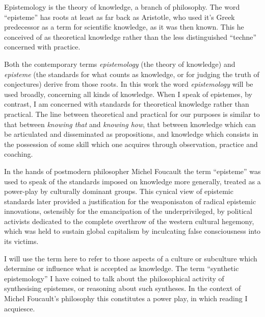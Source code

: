 \documentclass[10pt,titlepage]{article}
\begin{document}
Epistemology is the theory of knowledge, a branch of philosophy.
The word ``episteme'' has roots at least as far back as Aristotle, who used it's Greek predecessor as a term for scientific knowledge, as it was then known.
This he conceived of as theoretical knowledge rather than the less distinguished ``techne'' concerned with practice.

Both the contemporary terms \emph{epistemology} (the theory of knowledge) and \emph{episteme} (the standards for what counts as knowledge, or for judging the truth of conjectures) derive from those roots.
In this work the word \emph{epistemology} will be used broadly, concerning all kinds of knowledge.
When I speak of epistemes, by contrast, I am concerned with standards for theoretical knowledge rather than practical.
The line between theoretical and practical for our purposes is similar to that between \emph{knowing that} and \emph{knowing how}, that between knowledge which can be articulated and disseminated as propositions, and knowledge which consists in the possession of some skill which one acquires through observation, practice and coaching.

In the hands of postmodern philosopher Michel Foucault the term ``episteme'' was used to speak of the standards imposed on knowledge more generally, treated as a power-play by culturally dominant groups.
This cynical view of epistemic standards later provided a justification for the weaponisaton of radical epistemic innovations, ostensibly for the emancipation of the underprivileged, by political activists dedicated to the complete overthrow of the western cultural hegemony, which was held to sustain global capitalism by inculcating false consciousness into its victims.

I will use the term here to refer to those aspects of a culture or subculture which determine or influence what is accepted as knowledge.
The term ``synthetic epistemology'' I have coined to talk about the philosophical activity of synthesising epistemes, or reasoning about such syntheses.
In the context of Michel Foucault's philosophy this constitutes a power play, in which reading I acquiesce.
\end{document}
